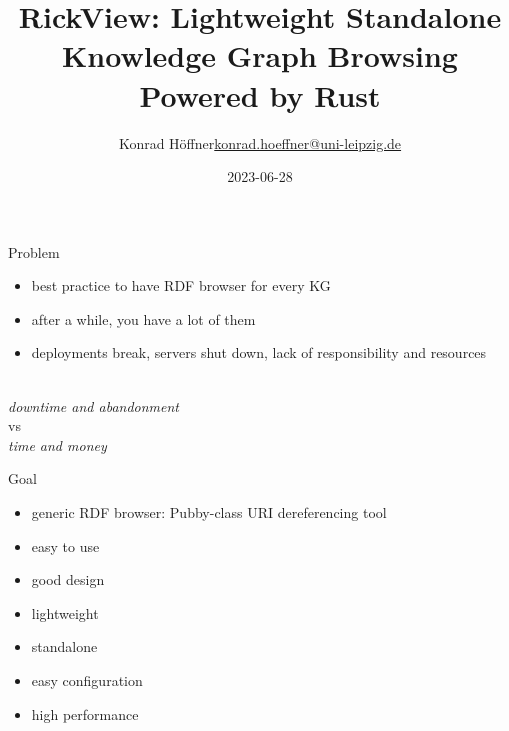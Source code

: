 \documentclass[14pt,aspectratio=169]{beamer}
\date{2023-06-28}
\author{\texorpdfstring{Konrad Höffner\newline\url{konrad.hoeffner@uni-leipzig.de}}{Konrad Höffner}}
\title{RickView: Lightweight Standalone Knowledge Graph Browsing Powered by Rust}
\subtitle{}
\begin{document}
\begin{frame}
\titlepage
\end{frame}

\begin{frame}{Problem}
\begin{itemize}
\item best practice to have RDF browser for every KG 
\item after a while, you have a lot of them
\item deployments break, servers shut down, lack of responsibility and resources
\end{itemize}
~\\
\centering
\emph{downtime and abandonment}\\
vs\\
\emph{time and money}
\end{frame}

\begin{frame}{Goal}
\begin{itemize}
\item generic RDF browser: Pubby-class URI dereferencing tool
\item easy to use
\item good design
\item lightweight
\item standalone%
\item easy configuration 
\item high performance
\end{itemize}
\end{frame}
\end{document}
